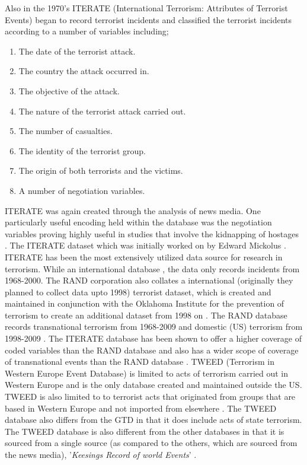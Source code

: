 Also in the 1970's ITERATE (International Terrorism: Attributes of Terrorist Events) began to record terrorist incidents and classified the terrorist incidents according to a number of variables including;  
\begin{enumerate}
\item The date of the terrorist attack.
\item The country the attack occurred in.
\item The objective of the attack.
\item The nature of the terrorist attack carried out.
\item The number of casualties.
\item The identity of the terrorist group.
\item The origin of both terrorists and the victims.
\item A number of negotiation variables.
\end{enumerate}
ITERATE was again created through the analysis of news media. One particularly useful encoding held within the database was the negotiation variables proving highly useful in studies that involve the kidnapping of hostages \citep{GPOL:GPOL142}. The ITERATE  dataset which was initially worked on by Edward Mickolus \citep{mickolus2013iterate}. ITERATE has been the most extensively utilized data source for research in terrorism. While an international database , the data only records incidents from  1968-2000. The RAND corporation also collates a international (originally they planned to collect data upto 1998) terrorist dataset, which is created and maintained in conjunction with the Oklahoma Institute for the prevention of terrorism to create an additional dataset from 1998 on \citep{lafree2007introducing}.  The RAND database records transnational terrorism from 1968-2009 and domestic (US) terrorism from 1998-2009 \citep{sandler2013analytical}. The ITERATE database has been shown to offer a higher coverage of coded variables than the RAND database and also has a wider scope of coverage of transnational events than the RAND database \citep{enders2011political}. TWEED (Terrorism in Western Europe Event Database) is limited to acts of terrorism carried out in Western Europe and is the only database created and maintained outside the US. TWEED is also limited to to terrorist acts that originated from groups that are based in Western Europe and not imported from elsewhere \citep{engene2007five}. The TWEED database also differs from the GTD in that it does include acts of state terrorism. The TWEED database is also different from the other databases in that it is sourced from a single source (as compared to the others, which are sourced from the news media), '\textit{Keesings Record of world Events}' \citep{east2016keesing}.

